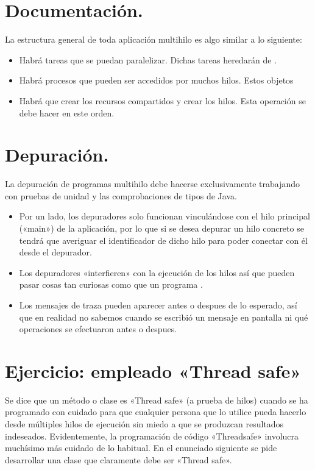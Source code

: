 \documentclass[letterpaper,10pt,spanish]{sphinxmanual}
\begin{document}
\section{Documentación.}
\label{\detokenize{textos/tema2:documentacion}}
La estructura general de toda aplicación multihilo es algo similar a lo siguiente:
\begin{itemize}
\item {} 
Habrá tareas que se puedan paralelizar. Dichas tareas heredarán de .

\item {} 
Habrá procesos que pueden ser accedidos por muchos hilos. Estos objetos 

\item {} 
Habrá que crear los recursos compartidos y crear los hilos. Esta operación se debe hacer en este orden.

\end{itemize}


\section{Depuración.}
\label{\detokenize{textos/tema2:depuracion}}
La depuración de programas multihilo debe hacerse exclusivamente trabajando con pruebas de unidad y las comprobaciones de tipos de Java.
\begin{itemize}
\item {} 
Por un lado, los depuradores solo funcionan vinculándose con el hilo principal («main») de la aplicación, por lo que si se desea depurar un hilo concreto se tendrá que averiguar el identificador de dicho hilo para poder conectar con él desde el depurador.

\item {} 
Los depuradores «interfieren» con la ejecución de los hilos así que pueden pasar cosas tan curiosas como que un programa .

\item {} 
Los mensajes de traza pueden aparecer antes o despues de lo esperado, así que en realidad no sabemos cuando se escribió un mensaje en pantalla ni qué operaciones se efectuaron antes o despues.

\end{itemize}


\section{Ejercicio: empleado «Thread safe»}
\label{\detokenize{textos/tema2:ejercicio-empleado-thread-safe}}
Se dice que un método o clase es «Thread safe» (a prueba de hilos) cuando se ha programado con cuidado para que cualquier persona que lo utilice pueda hacerlo desde múltiples hilos de ejecución sin miedo a que se produzcan resultados indeseados. Evidentemente, la programación de código «Thread\sphinxhyphen{}safe» involucra muchísimo más cuidado de lo habitual. En el enunciado siguiente se pide desarrollar una clase que claramente debe ser «Thread safe».
\end{document}
